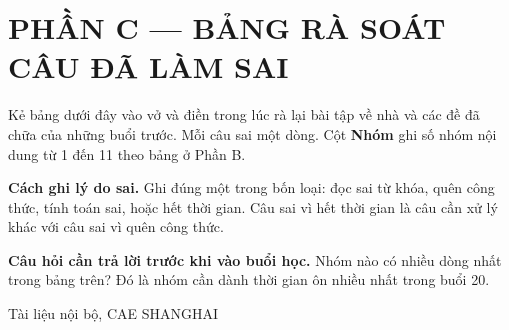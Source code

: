 \documentclass[11pt, a4paper]{article}
\begin{document}
\section{PHẦN C — BẢNG RÀ SOÁT CÂU ĐÃ LÀM SAI}

Kẻ bảng dưới đây vào vở và điền trong lúc rà lại bài tập về nhà và các đề đã chữa của những buổi trước. Mỗi câu sai một dòng. Cột \textbf{Nhóm} ghi số nhóm nội dung từ 1 đến 11 theo bảng ở Phần B.


\textbf{Cách ghi lý do sai.} Ghi đúng một trong bốn loại: đọc sai từ khóa, quên công thức, tính toán sai, hoặc hết thời gian. Câu sai vì hết thời gian là câu cần xử lý khác với câu sai vì quên công thức.

\textbf{Câu hỏi cần trả lời trước khi vào buổi học.} Nhóm nào có nhiều dòng nhất trong bảng trên? Đó là nhóm cần dành thời gian ôn nhiều nhất trong buổi 20.
\vspace{0.8cm}
\begin{center}
{\footnotesize\color{cae_blue} Tài liệu nội bộ, CAE SHANGHAI}
\end{center}
\end{document}
